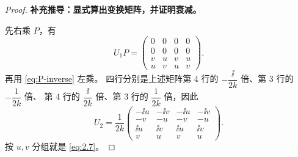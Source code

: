 \begin{proof}
\textbf{补充推导：显式算出变换矩阵，并证明衰减。}

先右乘 $P$，有
\[
U_1P=\begin{pmatrix}
0&0&0&0\\0&0&0&0\\v&u&v&u\\u&v&u&v
\end{pmatrix}.
\]
再用 \eqref{eq:P-inverse} 左乘。
四行分别是上述矩阵第 4 行的 $-\dfrac{\ii}{2k}$ 倍、第 3 行的 $-\dfrac{1}{2k}$ 倍、
第 4 行的 $\dfrac{\ii}{2k}$ 倍、第 3 行的 $\dfrac{1}{2k}$ 倍，因此
\[
U_2=\dfrac{1}{2k}
\begin{pmatrix}
-\ii u&-\ii v&-\ii u&-\ii v\\
-v&-u&-v&-u\\
\ii u&\ii v&\ii u&\ii v\\
v&u&v&u
\end{pmatrix}.
\]
按 $u,v$ 分组就是 \eqref{eq:2.7}。


\end{proof}
